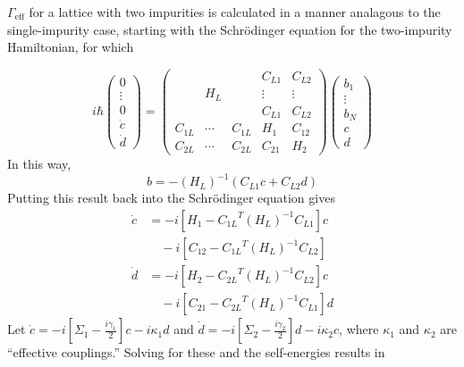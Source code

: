 \documentclass[aps,pra,superscriptaddress,twocolumn]{revtex4-1}
\newcommand{\commentSB}[1]{\texttt{\color{blue}[#1]}}
\begin{document}
$\Gamma_\text{eff}$ for a lattice with two impurities is calculated in a manner analagous to the single-impurity case, starting with the Schr\"odinger equation for the two-impurity Hamiltonian, for which 

\begin{equation}
    i \hbar \begin{pmatrix}
        0 \\ \vdots \\ 0 \\ \dot{c} \\ \dot{d}
    \end{pmatrix}
    = \begin{pmatrix}
        ~ & ~ & ~ &   C_{L1} & C_{L2} \\ 
        ~ & H_L & ~ & \vdots & \vdots \\
        ~ & ~ & ~ & C_{L1} &  C_{L2} \\
        C_{1L} & \cdots & C_{1L} & H_1 & C_{12} \\
        C_{2L} & \cdots & C_{2L} & C_{21} & H_2  
    \end{pmatrix} 
    \begin{pmatrix}
        b_1 \\ \vdots \\ b_N \\ c \\ d
    \end{pmatrix}
    \label{eqn:blockH2}
\end{equation} 
In this way, 
\begin{equation}
    b = -(H_L)^{-1} (C_{L1} c + C_{L2} d)
\end{equation}
Putting this result back into the Schr\"odinger equation gives
\begin{subequations}
\begin{align}
    \dot{c} &= -i \left[  H_1 - {C_{1L}}^T (H_L)^{-1} C_{L1}\right] c \nonumber\\
     &\quad- i \left[  C_{12} - {C_{1L}}^T (H_L)^{-1} C_{L2} \right]  \\
    \dot{d} &= -i \left[  H_2 - {C_{2L}}^T (H_L)^{-1} C_{L2}\right] c \nonumber\\
     &\quad- i \left[  C_{21} - {C_{2L}}^T (H_L)^{-1} C_{L1} \right] d 
\end{align}
\end{subequations}
Let $\dot{c} = -i [\Sigma_1 - \frac{i \gamma_1}{2}]c - i \kappa_1 d $ and $\dot{d} = -i [ \Sigma_2 - \frac{i \gamma_2}{2} ] d - i \kappa_2 c $, where $\kappa_1$ and $\kappa_2$ are ``effective couplings.'' Solving for these and the self-energies results in 
\end{document}
